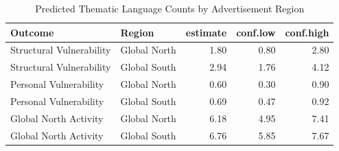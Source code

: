 \begin{table}[ht]
\centering
\begin{tabular}{llrrr}
  \hline
Outcome & Region & estimate & conf.low & conf.high \\ 
  \hline
Structural Vulnerability & Global North & 1.80 & 0.80 & 2.80 \\ 
  Structural Vulnerability & Global South & 2.94 & 1.76 & 4.12 \\ 
  Personal Vulnerability & Global North & 0.60 & 0.30 & 0.90 \\ 
  Personal Vulnerability & Global South & 0.69 & 0.47 & 0.92 \\ 
  Global North Activity & Global North & 6.18 & 4.95 & 7.41 \\ 
  Global North Activity & Global South & 6.76 & 5.85 & 7.67 \\ 
   \hline
\end{tabular}
\caption{Predicted Thematic Language Counts by Advertisement Region} 
\end{table}
